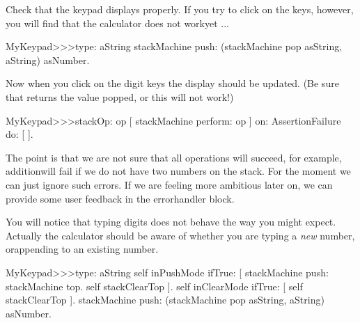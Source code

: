 \documentclass[a4paper,10pt,twoside]{book}
\begin{document}
Check that the keypad displays properly.
If you try to click on the keys, however, you will find that the calculator does not workyet ...

\begin{code}{}
MyKeypad>>>type: aString
	stackMachine push: (stackMachine pop asString, aString) asNumber.
\end{code}
Now when you click on the digit keys the display should be updated.
(Be sure that  returns the value popped, or this will not work!)

\begin{code}{}
MyKeypad>>>stackOp: op
	[ stackMachine perform: op ] on: AssertionFailure do: [ ].
\end{code}

The point is that we are not sure that all operations will succeed, for example, additionwill fail if we do not have two numbers on the stack.
For the moment we can just ignore such errors.
If we are feeling more ambitious later on, we can provide some user feedback in the errorhandler block.


You will notice that typing digits does not behave the way you might expect.
Actually the calculator should be aware of whether you are typing a \emph{new} number, orappending to an existing number.


\begin{code}{}
MyKeypad>>>type: aString
	self inPushMode ifTrue: [
		stackMachine push: stackMachine top.
		self stackClearTop ].
	self inClearMode ifTrue: [ self stackClearTop ].
	stackMachine push: (stackMachine pop asString, aString) asNumber.
\end{code}
\end{document}
